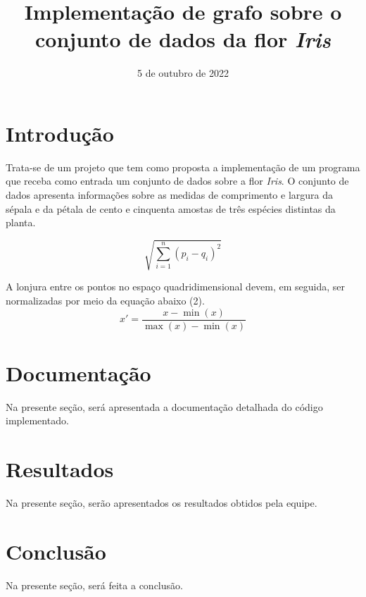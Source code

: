 \documentclass{article}
\title{Implementação de grafo sobre o conjunto de dados da flor {\it Iris\/}}
\author{\sc{Elian Babireski \& Vinícios Bidin}}
\date{5 de outubro de 2022}
\begin{document}
    \maketitle
    
    \section{Introdução}
        Trata-se de um projeto que tem como proposta a implementação de um programa que receba como entrada um conjunto de dados sobre a flor {\it Iris}. O conjunto de dados apresenta informações sobre as medidas de comprimento e largura da sépala e da pétala de cento e cinquenta amostas de três espécies distintas da planta.
    
        \begin{equation}
            \sqrt{\sum_{i = 1} ^ n (p_i - q_i) ^ 2}
        \end{equation}

        A lonjura entre os pontos no espaço quadridimensional devem, em seguida, ser normalizadas por meio da equação abaixo (2).
        \begin{equation}
            x' = \frac{x - \min(x)}{\max(x) - \min(x)}
        \end{equation}


    \section{Documentação}
        Na presente seção, será apresentada a documentação detalhada do código implementado.

    \section{Resultados}
        Na presente seção, serão apresentados os resultados obtidos pela equipe.
    
    \section{Conclusão}
        Na presente seção, será feita a conclusão.
\end{document}
